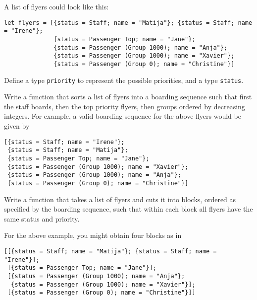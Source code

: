 \documentclass[arhiv]{../izpit}
\begin{document}
A list of flyers could look like this:
\begin{verbatim}
let flyers = [{status = Staff; name = "Matija"}; {status = Staff; name = "Irene"};
              {status = Passenger Top; name = "Jane"};
              {status = Passenger (Group 1000); name = "Anja"};
              {status = Passenger (Group 1000); name = "Xavier"};
              {status = Passenger (Group 0); name = "Christine"}]
\end{verbatim}

Define a type \verb|priority| to represent the possible priorities, and a type \verb|status|.

\naloga

Write a function that sorts a list of flyers into a boarding sequence such that first the staff boards, then the top priority flyers, then groups ordered by decreasing integers. For example, a valid boarding sequence for the above flyers would be given by

\begin{verbatim}
[{status = Staff; name = "Irene"};
 {status = Staff; name = "Matija"};
 {status = Passenger Top; name = "Jane"};
 {status = Passenger (Group 1000); name = "Xavier"};
 {status = Passenger (Group 1000); name = "Anja"};
 {status = Passenger (Group 0); name = "Christine"}]
\end{verbatim}

\naloga

Write a function that takes a list of flyers and cuts it into blocks, ordered as specified by the boarding sequence, such that within each block all flyers have the same status and priority.

For the above example, you might obtain four blocks as in
\begin{verbatim}
[[{status = Staff; name = "Matija"}; {status = Staff; name = "Irene"}];
 [{status = Passenger Top; name = "Jane"}];
 [{status = Passenger (Group 1000); name = "Anja"};
  {status = Passenger (Group 1000); name = "Xavier"}];
 [{status = Passenger (Group 0); name = "Christine"}]]
\end{verbatim}
\end{document}

